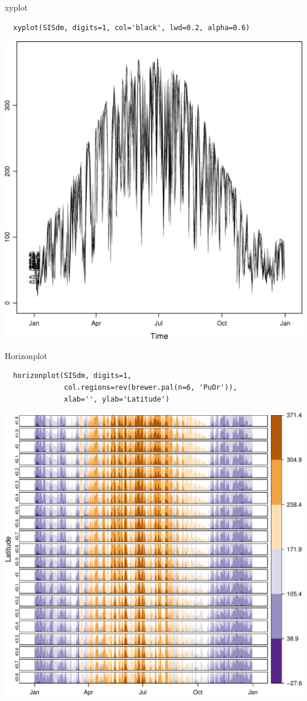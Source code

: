 \documentclass[xcolor={usenames,svgnames,dvipsnames}]{beamer}
\begin{document}
\begin{frame}[fragile,label=sec-4-12]{xyplot}
 \lstset{language=R,label= ,caption= ,numbers=none}
\begin{lstlisting}
  xyplot(SISdm, digits=1, col='black', lwd=0.2, alpha=0.6)
\end{lstlisting}

\includegraphics[width=.9\linewidth]{figs/SISmm_xyplot.png}
\end{frame}

\begin{frame}[fragile,label=sec-4-13]{Horizonplot}
 \lstset{language=R,label= ,caption= ,numbers=none}
\begin{lstlisting}
  horizonplot(SISdm, digits=1,
              col.regions=rev(brewer.pal(n=6, 'PuOr')),
              xlab='', ylab='Latitude')
\end{lstlisting}

\includegraphics[width=.9\linewidth]{figs/SISdm_horizonplot.pdf}
\end{frame}
\end{document}
